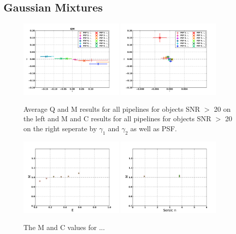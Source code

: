 \newpage 
\subsection{Gaussian Mixtures}
\begin{figure}
\centering
\includegraphics[width=0.45\textwidth]{fig/QMC_main_GM_f.pdf} 
\includegraphics[width=0.45\textwidth]{fig/MC_main_GM_f.pdf} 
\caption{Average Q and M results for all pipelines for objects 
SNR $>$ 20 on the left and M and C results for all pipelines for objects 
SNR $>$ 20 on the right seperate by $\gamma_{1} $ and $\gamma_{2} $ as
well as PSF.}
\label{fig:Gmix_qmc}
\end{figure}

\begin{figure}
\centering
\includegraphics[width=0.45\textwidth]{fig/MvaleGM.pdf} 
\includegraphics[width=0.45\textwidth]{fig/Mval_typeGM.pdf} 
\caption{The M and C values for ...}
\label{fig:DEIMOS_m}
\end{figure}

